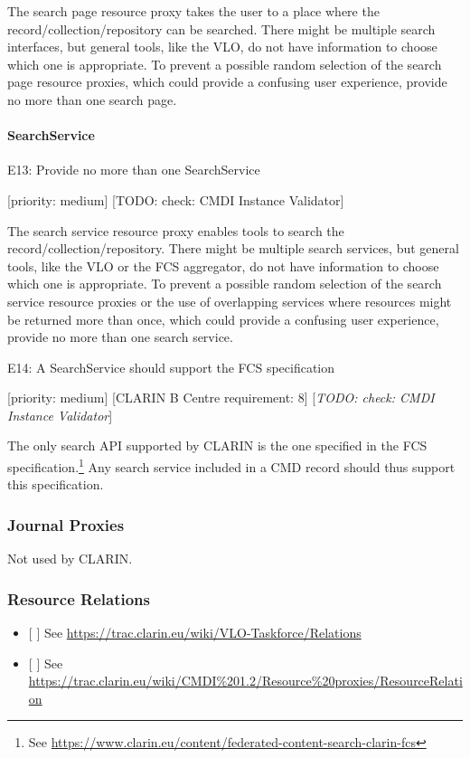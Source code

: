\documentclass[]{article}
\let\oldparagraph\paragraph
\renewcommand{\paragraph}[1]{\oldparagraph{#1}\mbox{}}
\begin{document}
The search page resource proxy takes the user to a place where the
record/collection/repository can be searched. There might be multiple
search interfaces, but general tools, like the VLO, do not have
information to choose which one is appropriate. To prevent a possible
random selection of the search page resource proxies, which could
provide a confusing user experience, provide no more than one search
page.

\paragraph{SearchService}\label{searchservice}

E13: Provide no more than one SearchService

{[}priority: medium{]} {[}TODO: check: CMDI Instance Validator{]}

The search service resource proxy enables tools to search the
record/collection/repository. There might be multiple search services,
but general tools, like the VLO or the FCS aggregator, do not have
information to choose which one is appropriate. To prevent a possible
random selection of the search service resource proxies or the use of
overlapping services where resources might be returned more than once,
which could provide a confusing user experience, provide no more than
one search service.

E14: A SearchService should support the FCS specification

{[}priority: medium{]} {[}CLARIN B Centre requirement: 8{]}
{[}\emph{TODO: check: CMDI Instance Validator}{]}

The only search API supported by CLARIN is the one specified in the FCS
specification.\footnote{See
  \url{https://www.clarin.eu/content/federated-content-search-clarin-fcs}}
Any search service included in a CMD record should thus support this
specification.

\subsubsection{Journal Proxies}\label{journal-proxies}

Not used by CLARIN.

\subsubsection{Resource Relations}\label{resource-relations}

\begin{itemize}
\item
  {[} {]} See \url{https://trac.clarin.eu/wiki/VLO-Taskforce/Relations}
\item
  {[} {]} See
  \url{https://trac.clarin.eu/wiki/CMDI\%201.2/Resource\%20proxies/ResourceRelation}
\end{itemize}
\end{document}

